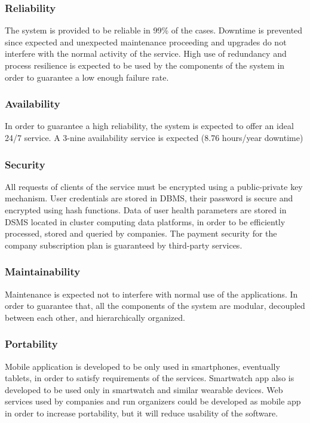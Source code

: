 \subsubsection{Reliability}
The system is provided to be reliable in 99\% of the cases. Downtime is prevented since expected and unexpected maintenance proceeding and upgrades do not interfere with the normal activity of the service.
High use of redundancy and process resilience is expected to be used by the components of the system in order to guarantee a low enough failure rate.

\subsubsection{Availability}
In order to guarantee a high reliability, the system is expected to offer an ideal 24/7 service. A 3-nine availability service is expected (8.76 hours/year downtime)

\subsubsection{Security}
All requests of clients of the service must be encrypted using a public-private key mechanism.
User credentials are stored in DBMS, their password is secure and encrypted using hash functions.
Data of user health parameters are stored in DSMS located in cluster computing data platforms, in order to be efficiently processed, stored and queried by companies.
The payment security for the company subscription plan is guaranteed by third-party services. 
\subsubsection{Maintainability}
Maintenance is expected not to interfere with normal use of the applications. In order to guarantee that, all the components of the system are modular, decoupled between each other, and hierarchically organized.
\subsubsection{Portability}
Mobile application is developed to be only used in smartphones, eventually tablets, in order to satisfy requirements of the services.
Smartwatch app also is developed to be used only in smartwatch and similar wearable devices.
Web services used by companies and run organizers could be developed as mobile app in order to increase portability, but it will reduce usability of the software. 
